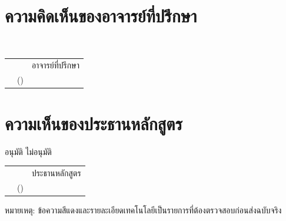 \documentclass[17pt,a4paper,oneside]{extarticle}
\makeatletter
\newcommand{\pending}[1]{\textcolor{red!70!black}{#1}}
\newcommand{\signatureblock}[2]{%
  \noindent\begin{tabularx}{\textwidth}{@{}X>{\centering\arraybackslash}p{7cm}@{\hspace{0.5em}}p{3.3cm}@{}}
    & \hrulefill & #1 \\
    & (#2) & \\
  \end{tabularx}}
\makeatother
\begin{document}
\clearpage
\section{ความคิดเห็นของอาจารย์ที่ปรึกษา}
\noindent\dotfill\\[1.2cm]
\vspace{36pt}
\signatureblock{อาจารย์ที่ปรึกษา}{\proposaladvisor}

\section{ความเห็นของประธานหลักสูตร}
\noindent \fbox{\rule{0pt}{0.55em}\hspace{0.55em}} อนุมัติ\qquad
\fbox{\rule{0pt}{0.55em}\hspace{0.55em}} ไม่อนุมัติ\\[1.2cm]
\vspace{36pt}
\signatureblock{ประธานหลักสูตร}{\pending{\proposalchair}}

\vfill
\noindent\footnotesize\textcolor{gray!70!black}{หมายเหตุ: ข้อความสีแดงและรายละเอียดเทคโนโลยีเป็นรายการที่ต้องตรวจสอบก่อนส่งฉบับจริง}
\end{document}
